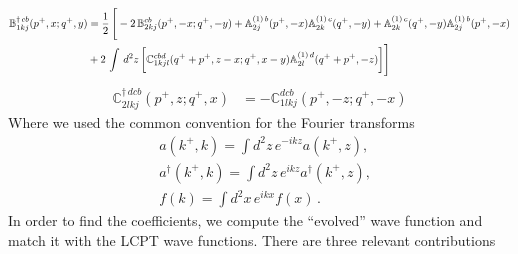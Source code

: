 \documentclass[aps,prd,amsmath,amssymb,nofootinbib]{revtex4-2}
\def\mf#1{\mathbb{#1}}
\numberwithin{equation}{section}
\begin{document}
\begin{align}
    \mf{B}^{\dagger\, cb}_{1kj}(p^{+},x; q^{+},y) & = \frac{1}{2}\, \Bigg[-2\,\mf{B}^{cb}_{2kj}(p^{+},-x; q^{+},-y)+\mf{A}^{(1)\, b}_{2j}(p^{+},-x)\mf{A}^{(1)\, c}_{2k}(q^{+},-y)+ \mf{A}^{(1)\, c}_{2k}(q^{+},-y)\mf{A}^{(1)\, b}_{2j}(p^{+},-x)\notag \\ & +2\,\int\, d^{2}z\, \bigg[\mf{C}^{cbd}_{1kjl}(q^{+}+p^{+},z-x; q^{+},x-y)\mf{A}^{(1)\,d}_{2l}(q^{+}+p^{+},-z)\bigg]\Bigg]
\end{align}
\begin{align}
     \mf{C}^{\dagger\, dcb}_{2lkj}(p^{+},z; q^{+},x) & =  -\mf{C}^{dcb}_{1lkj}(p^{+}, -z; q^{+}, -x)
\end{align}
Where we used the common  convention for the Fourier transforms 
\begin{align}
    &a(k^+, k) = \int d^2z\, e^{-i k z} a(k^+,z), \\ 
    &a^\dagger(k^+, k) = \int d^2z\, e^{i k z} a^\dagger(k^+, z), \\ 
    & f (k) = \int d^2x\, e^{ikx} f(x)\,.
\end{align}
In order to find the coefficients, we compute the ``evolved'' wave function and match it with the LCPT wave functions. There are three relevant contributions 
\end{document}
